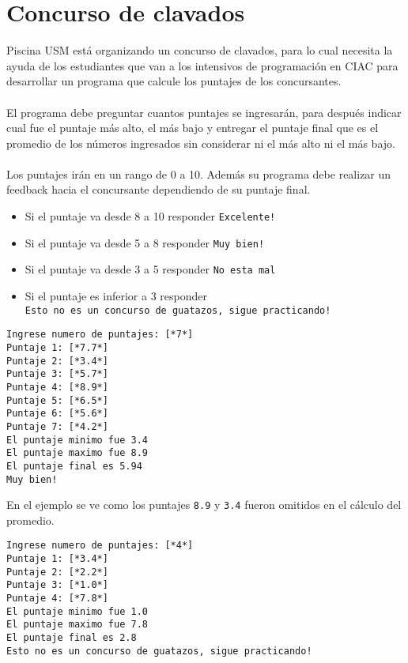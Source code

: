 \section{Concurso de clavados}
Piscina USM está organizando un concurso de clavados, para lo cual necesita la ayuda de los estudiantes que van a los intensivos de programación en CIAC para desarrollar un programa que calcule los puntajes de los concursantes.
\\ \\
El programa debe preguntar cuantos puntajes se ingresarán, para después indicar cual fue el puntaje más alto, el más bajo y entregar el puntaje final que es el promedio de los números ingresados sin considerar ni el más alto ni el más bajo.
\\ \\
Los puntajes irán en un rango de 0 a 10. Además su programa debe realizar un feedback hacia el concursante dependiendo de su puntaje final.
\\
\begin{itemize}
    \item Si el puntaje va desde 8 a 10 responder \texttt{Excelente!}
    \item Si el puntaje va desde 5 a 8 responder \texttt{Muy bien!}
    \item Si el puntaje va desde 3 a 5 responder \texttt{No esta mal}
    \item Si el puntaje es inferior a 3 responder\\ \texttt{Esto no es un concurso de guatazos, sigue practicando!}
\end{itemize}

\begin{lstlisting}[style=consola]
Ingrese numero de puntajes: [*7*]
Puntaje 1: [*7.7*]
Puntaje 2: [*3.4*]
Puntaje 3: [*5.7*]
Puntaje 4: [*8.9*]
Puntaje 5: [*6.5*]
Puntaje 6: [*5.6*]
Puntaje 7: [*4.2*]
El puntaje minimo fue 3.4
El puntaje maximo fue 8.9
El puntaje final es 5.94
Muy bien!
\end{lstlisting}

En el ejemplo se ve como los puntajes \texttt{8.9} y \texttt{3.4} fueron omitidos en el cálculo del promedio.

\begin{lstlisting}[style=consola]
Ingrese numero de puntajes: [*4*]
Puntaje 1: [*3.4*]
Puntaje 2: [*2.2*]
Puntaje 3: [*1.0*]
Puntaje 4: [*7.8*]
El puntaje minimo fue 1.0
El puntaje maximo fue 7.8
El puntaje final es 2.8
Esto no es un concurso de guatazos, sigue practicando!
\end{lstlisting}